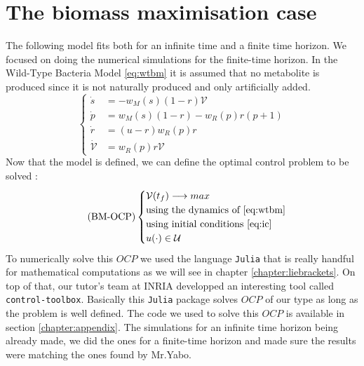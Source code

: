 \documentclass{tudelft-report}
\begin{document}
\section*{The biomass maximisation case}\noindent
The following model fits both for an infinite time and a finite time horizon. We focused on doing the numerical simulations for the finite-time horizon. In the Wild-Type Bacteria Model \eqref{eq:wtbm} it is assumed that no metabolite is produced since it is not naturally produced and only artificially added.
\begin{equation*}\tag{WTB-M}\label{eq:wtbm}
\begin{cases}
 \dot{s} &= -w_M(s)(1-r)\mathcal{V}\\
 \dot{p} &= w_M(s)(1-r) - w_R(p) r  (p+1)\\
 \dot{r} &= (u-r) w_R(p) r\\
 \dot{\mathcal{V}} &= w_R(p) r  \mathcal{V}
\end{cases}
\end{equation*}\noindent
Now that the model is defined, we can define the optimal control problem to be solved :
\begin{equation*}\tag{BM-OCP}\label{eq:bmocp}
\begin{cases}
 \mathcal{V}(t_f) \longrightarrow max\\
 \textrm{using the dynamics of }\eqref{eq:wtbm}\\
 \textrm{using initial conditions }\eqref{eq:ic}\\
 u(\cdot)\in \mathcal{U}
\end{cases}
\end{equation*}\noindent
To numerically solve this $OCP$ we used the language \verb|Julia| that is really handful for mathematical computations as we will see in chapter \ref{chapter:liebrackets}. On top of that, our tutor's team at INRIA developped an interesting tool called \verb|control-toolbox|. Basically this \verb|Julia| package solves $OCP$ of our type as long as the problem is well defined. The code we used to solve this $OCP$ is available in section \ref{chapter:appendix}.
The simulations for an infinite time horizon being already made, we did the ones for a finite-time horizon and made sure the results were matching the ones found by Mr.Yabo. 
\end{document}
